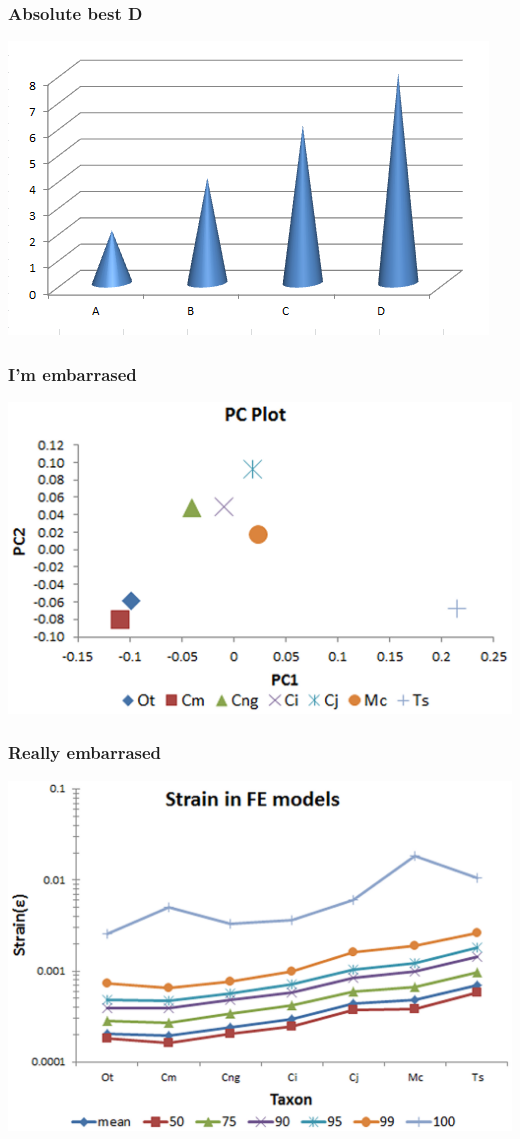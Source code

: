 \documentclass{beamer}
\begin{document}
\begin{frame}
  \frametitle{Absolute best D}
  \includegraphics[width = \textwidth, keepaspectratio = true]{figure/cones}
\end{frame}

\begin{frame}
  \frametitle{I'm embarrased}
  \includegraphics[width = \textwidth, keepaspectratio = true]{figure/wamsley_pca}
\end{frame}

\begin{frame}
  \frametitle{Really embarrased}
  \includegraphics[height = 0.8\textheight, keepaspectratio = true]{figure/wamsley_line}
\end{frame}
\end{document}
